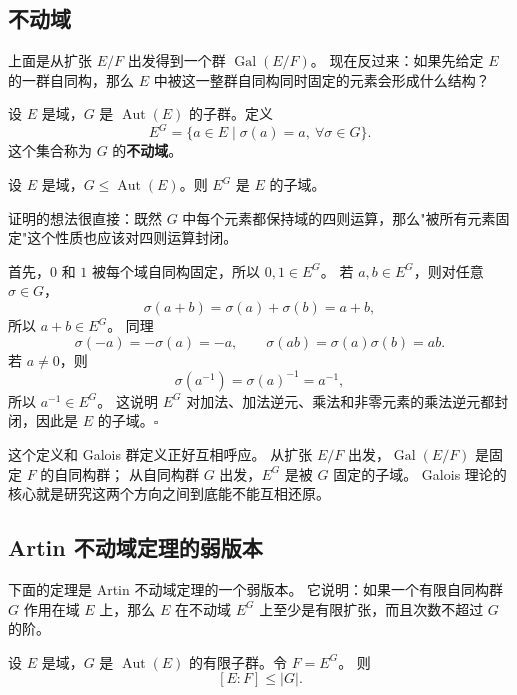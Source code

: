 \subsection{不动域}

上面是从扩张 $E/F$ 出发得到一个群 $\operatorname{Gal}(E/F)$。
现在反过来：如果先给定 $E$ 的一群自同构，那么 $E$ 中被这一整群自同构同时固定的元素会形成什么结构？

\begin{definition}[不动域]\label{def:fixed-field-of-group}
设 $E$ 是域，$G$ 是 $\operatorname{Aut}(E)$ 的子群。定义
\[
E^G=\{a\in E\mid \sigma(a)=a,\ \forall \sigma\in G\}.
\]
这个集合称为 $G$ 的\textbf{不动域}。
\end{definition}

\begin{proposition}[不动域是域]\label{prop:fixed-field-is-field}
设 $E$ 是域，$G\leq \operatorname{Aut}(E)$。则 $E^G$ 是 $E$ 的子域。
\end{proposition}

证明的想法很直接：既然 $G$ 中每个元素都保持域的四则运算，那么"被所有元素固定"这个性质也应该对四则运算封闭。

首先，$0$ 和 $1$ 被每个域自同构固定，所以 $0,1\in E^G$。
若 $a,b\in E^G$，则对任意 $\sigma\in G$，
\[
\sigma(a+b)=\sigma(a)+\sigma(b)=a+b,
\]
所以 $a+b\in E^G$。
同理
\[
\sigma(-a)=-\sigma(a)=-a,\qquad
\sigma(ab)=\sigma(a)\sigma(b)=ab.
\]
若 $a\neq0$，则
\[
\sigma(a^{-1})=\sigma(a)^{-1}=a^{-1},
\]
所以 $a^{-1}\in E^G$。
这说明 $E^G$ 对加法、加法逆元、乘法和非零元素的乘法逆元都封闭，因此是 $E$ 的子域。$\square$

这个定义和 Galois 群定义正好互相呼应。
从扩张 $E/F$ 出发，$\operatorname{Gal}(E/F)$ 是固定 $F$ 的自同构群；
从自同构群 $G$ 出发，$E^G$ 是被 $G$ 固定的子域。
Galois 理论的核心就是研究这两个方向之间到底能不能互相还原。

\subsection{Artin 不动域定理的弱版本}

下面的定理是 Artin 不动域定理的一个弱版本。
它说明：如果一个有限自同构群 $G$ 作用在域 $E$ 上，那么 $E$ 在不动域 $E^G$ 上至少是有限扩张，而且次数不超过 $G$ 的阶。

\begin{theorem}\label{thm:artin-fixed-field-weak}
设 $E$ 是域，$G$ 是 $\operatorname{Aut}(E)$ 的有限子群。令 $F=E^G$。
则
\[
[E:F]\leq |G|.
\]
\end{theorem}

